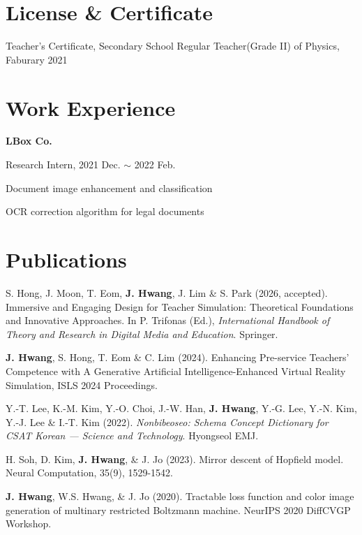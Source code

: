 \documentclass[margin,line]{res}
\newenvironment{list1}{
  \begin{list}{\ding{113}}{%
      \setlength{\itemsep}{0in}
      \setlength{\parsep}{0in} \setlength{\parskip}{0in}
      \setlength{\topsep}{0in} \setlength{\partopsep}{0in} 
      \setlength{\leftmargin}{0.17in}}}{\end{list}}
\begin{document}
\begin{resume}
\section{\sc License \& Certificate}
Teacher's Certificate, Secondary School Regular Teacher(Grade II) of Physics, Faburary 2021\\


\section{\sc Work  \phantom{MM} Experience}
{\bf LBox Co.}\\
\vspace*{-.1in}
\begin{list1}
\item[] Research Intern, 2021 Dec. $\sim$ 2022 Feb.
\item[] Document image enhancement and classification
\item[] OCR correction algorithm for legal documents
\end{list1}


\section{\sc Publications}
S. Hong, J. Moon, T. Eom, {\bf J. Hwang}, J. Lim \& S. Park (2026, accepted). Immersive and Engaging Design for Teacher Simulation: Theoretical Foundations and Innovative Approaches. In P. Trifonas (Ed.), \textit{International Handbook of Theory and Research in Digital Media and Education}. Springer.

{\bf J. Hwang}, S. Hong, T. Eom \& C. Lim (2024). Enhancing Pre-service Teachers’ Competence with A Generative Artificial Intelligence-Enhanced Virtual Reality Simulation, ISLS 2024 Proceedings.

Y.-T. Lee, K.-M. Kim, Y.-O. Choi, J.-W. Han, {\bf J. Hwang}, Y.-G. Lee, Y.-N. Kim, Y.-J. Lee \& I.-T. Kim (2022). \textit{Nonbibeoseo: Schema Concept Dictionary for CSAT Korean — Science and Technology}. Hyongseol EMJ.

H. Soh, D. Kim, {\bf J. Hwang}, \& J. Jo (2023). Mirror descent of Hopfield model. Neural Computation, 35(9), 1529-1542.

{\bf J. Hwang}, W.S. Hwang, \& J. Jo (2020). Tractable loss function and color image generation of multinary restricted Boltzmann machine. NeurIPS 2020 DiffCVGP Workshop.





\end{resume}
\end{document}
